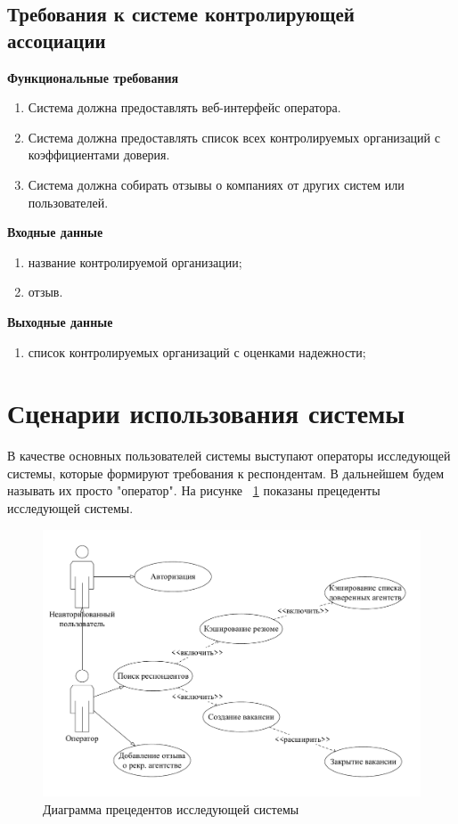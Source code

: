 \subsection{Требования к системе контролирующей ассоциации}

\textbf{Функциональные требования}
\begin{enumerate}
\item Система должна предоставлять веб-интерфейс оператора.
\item Система должна предоставлять список всех контролируемых организаций с коэффициентами доверия.
\item Система должна собирать отзывы о компаниях от других систем или пользователей.
\end{enumerate}

\textbf{Входные данные}
\begin{enumerate}
\item название контролируемой организации;
\item отзыв.
\end{enumerate}

\textbf{Выходные данные}
\begin{enumerate}
\item список контролируемых организаций с оценками надежности;
\end{enumerate}

\section{Сценарии использования системы}
В качестве основных пользователей системы выступают операторы исследующей системы, которые формируют требования к респондентам. В дальнейшем будем называть их просто "оператор". На рисунке ~\ref{fig:usecase} показаны прецеденты исследующей системы. 

\begin{figure}[ht]
  \centering
  \includegraphics[width=\textwidth]{include/usecase.pdf}
  \caption{Диаграмма прецедентов исследующей системы}
  \label{fig:usecase}
\end{figure}

